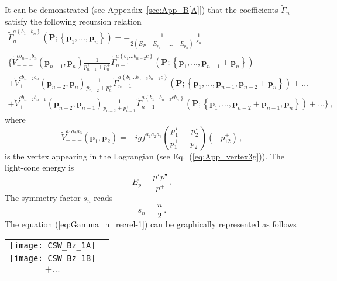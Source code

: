 \documentclass[english,american]{article}
\newcommand\myref{\refstepcounter{equation}\theequation}
\newcommand{\refmyref}[1]{\newcounter{#1}\setcounter{#1}{\theequation}}
\begin{document}
It can be demonstrated  (see Appendix~\ref{sec:App_B[A]})  that the coefficients $\tilde{\Gamma}_{n}$  satisfy the following recursion relation
\begin{multline}
\tilde{\Gamma}_{n}^{a\left\{ b_{1}\dots b_{n}\right\} }\left(\mathbf{P};\left\{ \mathbf{p}_{1},\dots,\mathbf{p}_{n}\right\} \right)=-\frac{1}{2\left(E_{P}-E_{p_{1}}-\dots-E_{p_{n}}\right)}\,\frac{1}{s_{n}}\\
\Bigg\{\tilde{V}_{++-}^{cb_{n-1}b_{n}}\left(\mathbf{p}_{n-1},\mathbf{p}_{n}\right)\frac{1}{p_{n-1}^{+}+p_{n}^{+}}\tilde{\Gamma}_{n-1}^{a\left\{ b_{1}\dots b_{n-2}c\right\} }\left(\mathbf{P};\left\{ \mathbf{p}_{1},\dots,\mathbf{p}_{n-1}+\mathbf{p}_{n}\right\} \right)\\
+\tilde{V}_{++-}^{cb_{n-2}b_{n}}\left(\mathbf{p}_{n-2},\mathbf{p}_{n}\right)\frac{1}{p_{n-2}^{+}+p_{n}^{+}}\tilde{\Gamma}_{n-1}^{a\left\{ b_{1}\dots b_{n-3}b_{n-1}c\right\} }\left(\mathbf{P};\left\{ \mathbf{p}_{1},\dots,\mathbf{p}_{n-1},\mathbf{p}_{n-2}+\mathbf{p}_{n}\right\} \right)+\dots\\
+\tilde{V}_{++-}^{cb_{n-2}b_{n-1}}\left(\mathbf{p}_{n-2},\mathbf{p}_{n-1}\right)\frac{1}{p_{n-2}^{+}+p_{n-1}^{+}}\tilde{\Gamma}_{n-1}^{a\left\{ b_{1}\dots b_{n-3}cb_{n}\right\} }\left(\mathbf{P};\left\{ \mathbf{p}_{1},\dots,\mathbf{p}_{n-2}+\mathbf{p}_{n-1},\mathbf{p}_{n}\right\} \right)+\dots\Bigg\}\,,\label{eq:Gamma_n_recrel-1}
\end{multline}
where
\begin{equation}
\tilde{V}_{++-}^{a_{1}a_{2}a_{3}}\left(\mathbf{p}_{1},\mathbf{p}_{2}\right)=-igf^{a_{1}a_{2}a_{3}}\left(\frac{p_{1}^{\star}}{p_{1}^{+}}-\frac{p_{2}^{\star}}{p_{2}^{+}}\right)\left(-p_{12}^{+}\right)\,,\label{eq:vertex_++-}
\end{equation}
is the vertex appearing in the Lagrangian (see Eq.~(\ref{eq:App_vertex3g})).
The light-cone energy is
\begin{equation}
E_{p}=\frac{p^{\star}p^{\bullet}}{p^{+}}\,.\label{eq:Ep_def}
\end{equation}
The symmetry factor $s_{n}$ reads
\begin{equation}
s_{n}=\frac{n}{2}\,.
\end{equation}
The equation (\ref{eq:Gamma_n_recrel-1}) can be graphically represented
as follows

\begin{tabular}{>{\centering}m{}>{\centering}m{}}
\bigskip{}


\raggedright{}\texttt{[image: CSW\_Bz\_1A]} & \tabularnewline
\raggedleft{}\texttt{[image: CSW\_Bz\_1B]} & \centering{}\tabularnewline
\[
+\dots
\]
 & \centering{}\centering{(\myref )}
\refmyref{Gamma_diag1}\tabularnewline
\end{tabular}
\end{document}
